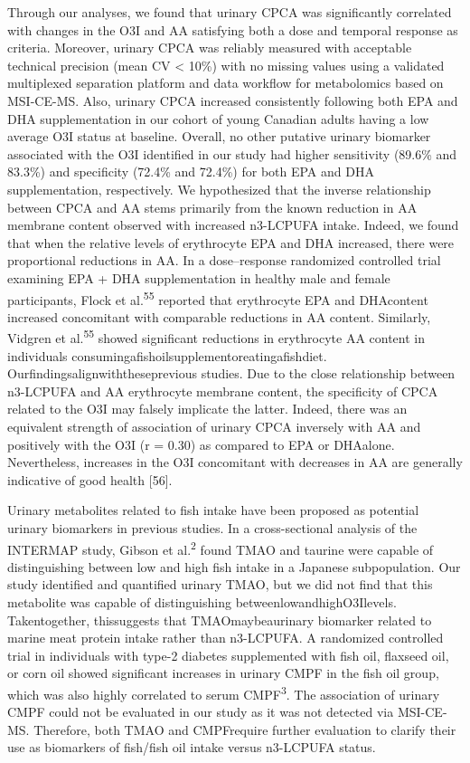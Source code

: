 \documentclass[journal=jacsat,manuscript=article]{achemso}
\begin{document}
Through our analyses, we found that urinary CPCA was significantly
correlated with changes in the O3I and AA satisfying both a dose and
temporal response as criteria. Moreover, urinary CPCA was reliably
measured with acceptable technical precision (mean CV \textless{} 10\%)
with no missing values using a validated multiplexed separation platform
and data workflow for metabolomics based on MSI-CE-MS. Also, urinary
CPCA increased consistently following both EPA and DHA supplementation
in our cohort of young Canadian adults having a low average O3I status
at baseline. Overall, no other putative urinary biomarker associated
with the O3I identified in our study had higher sensitivity (89.6\% and
83.3\%) and specificity (72.4\% and 72.4\%) for both EPA and DHA
supplementation, respectively. We hypothesized that the inverse
relationship between CPCA and AA stems primarily from the known
reduction in AA membrane content observed with increased n3-LCPUFA
intake. Indeed, we found that when the relative levels of erythrocyte
EPA and DHA increased, there were proportional reductions in AA. In a
dose--response randomized controlled trial examining EPA + DHA
supplementation in healthy male and female participants, Flock et
al.\textsuperscript{55} reported that erythrocyte EPA and DHAcontent
increased concomitant with comparable reductions in AA content.
Similarly, Vidgren et al.\textsuperscript{55} showed significant
reductions in erythrocyte AA content in individuals
consumingafishoilsupplementoreatingafishdiet.
Ourfindingsalignwiththeseprevious studies. Due to the close relationship
between n3-LCPUFA and AA erythrocyte membrane content, the specificity
of CPCA related to the O3I may falsely implicate the latter. Indeed,
there was an equivalent strength of association of urinary CPCA
inversely with AA and positively with the O3I (r = 0.30) as compared to
EPA or DHAalone. Nevertheless, increases in the O3I concomitant with
decreases in AA are generally indicative of good health {[}56{]}.

Urinary metabolites related to fish intake have been proposed as
potential urinary biomarkers in previous studies. In a cross-sectional
analysis of the INTERMAP study, Gibson et al.\textsuperscript{2} found
TMAO and taurine were capable of distinguishing between low and high
fish intake in a Japanese subpopulation. Our study identified and
quantified urinary TMAO, but we did not find that this metabolite was
capable of distinguishing betweenlowandhighO3Ilevels. Takentogether,
thissuggests that TMAOmaybeaurinary biomarker related to marine meat
protein intake rather than n3-LCPUFA. A randomized controlled trial in
individuals with type-2 diabetes supplemented with fish oil, flaxseed
oil, or corn oil showed significant increases in urinary CMPF in the
fish oil group, which was also highly correlated to serum
CMPF\textsuperscript{3}. The association of urinary CMPF could not be
evaluated in our study as it was not detected via MSI-CE-MS. Therefore,
both TMAO and CMPFrequire further evaluation to clarify their use as
biomarkers of fish/fish oil intake versus n3-LCPUFA status.
\end{document}
